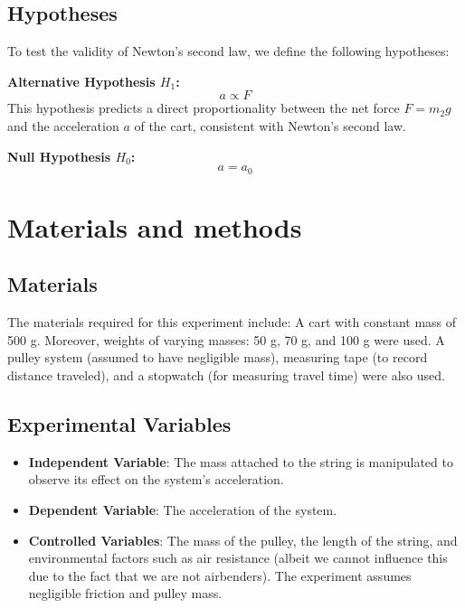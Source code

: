 ﻿\documentclass[reprint,amsmath,amssymb,aps]{revtex4-2}
\begin{document}
\subsection{Hypotheses}
To test the validity of Newton’s second law, we define the following hypotheses:

\textbf{Alternative Hypothesis \( H_1 \):}
\begin{equation}
    a \propto F
\end{equation}
This hypothesis predicts a direct proportionality between the net force \( F = m_2 g \) and the acceleration \( a \) of the cart, consistent with Newton’s second law.

\textbf{Null Hypothesis \( H_0 \):}
\begin{equation}
    a = a_0
\end{equation}










\section{Materials and methods}

\subsection{Materials}
The materials required for this experiment include:
A cart with constant mass of 500 g. Moreover, weights of varying masses: 50 g, 70 g, and 100 g were used. A pulley system (assumed to have negligible mass), measuring tape (to record distance traveled), and a stopwatch (for measuring travel time) were also used.

\subsection{Experimental Variables}
\begin{itemize}
    \item \textbf{Independent Variable}: The mass attached to the string is manipulated to observe its effect on the system's acceleration.
    \item \textbf{Dependent Variable}: The acceleration of the system.
    \item \textbf{Controlled Variables}: The mass of the pulley, the length of the string, and environmental factors such as air resistance (albeit we cannot influence this due to the fact that we are not airbenders). The experiment assumes negligible friction and pulley mass.
\end{itemize}
\end{document}
